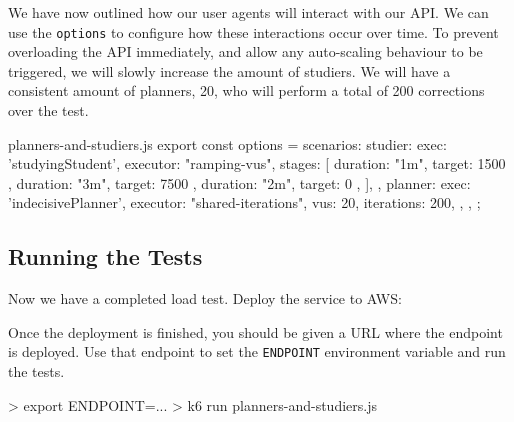 \documentclass{csse4400}
\begin{document}
We have now outlined how our user agents will interact with our API.
We can use the \texttt{options} to configure how these interactions occur over time.
To prevent overloading the API immediately,
and allow any auto-scaling behaviour to be triggered,
we will slowly increase the amount of studiers.
We will have a consistent amount of planners, 20,
who will perform a total of 200 corrections over the test.
%
\begin{code}[language=JavaScript,numbers=none]{planners-and-studiers.js}
export const options = {
    scenarios: {
        studier: {
            exec: 'studyingStudent',
            executor: "ramping-vus",
            stages: [
                { duration: "1m", target: 1500 },
                { duration: "3m", target: 7500 },
                { duration: "2m", target: 0 },
            ],
        },
        planner: {
            exec: 'indecisivePlanner',
            executor: "shared-iterations",
            vus: 20,
            iterations: 200,
        },
    },
};
\end{code}

\subsection{Running the Tests}

Now we have a completed load test.
Deploy the service to AWS:


Once the deployment is finished,
you should be given a URL where the endpoint is deployed.
Use that endpoint to set the \texttt{ENDPOINT} environment variable and run the tests.
%
\begin{code}[language=bash,numbers=none]{}
> export ENDPOINT=...
> k6 run planners-and-studiers.js
\end{code}
\end{document}
